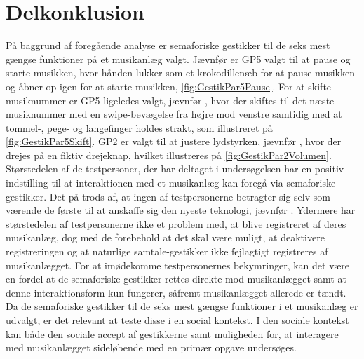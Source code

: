 \section{Delkonklusion}
\label{ValgAfGestikkerDelkonklusion}
%
På baggrund af foregående analyse er semaforiske gestikker til de seks mest gængse funktioner på et musikanlæg valgt. Jævnfør  er GP5 valgt til at pause og starte musikken, hvor hånden lukker som et krokodillenæb for at pause musikken og åbner op igen for at starte musikken, \autoref{fig:GestikPar5Pause}. For at skifte musiknummer er GP5 ligeledes valgt, jævnfør , hvor der skiftes til det næste musiknummer med en swipe-bevægelse fra højre mod venstre samtidig med at tommel-, pege- og langefinger holdes strakt, som illustreret på \autoref{fig:GestikPar5Skift}. GP2 er valgt til at justere lydstyrken, jævnfør , hvor der drejes på en fiktiv drejeknap, hvilket illustreres på \autoref{fig:GestikPar2Volumen}. Størstedelen af de testpersoner, der har deltaget i undersøgelsen har en positiv indstilling til at interaktionen med et musikanlæg kan foregå via semaforiske gestikker. Det på trods af, at ingen af testpersonerne betragter sig selv som værende de første til at anskaffe sig den nyeste teknologi, jævnfør . Ydermere har størstedelen af testpersonerne ikke et problem med, at blive registreret af deres musikanlæg, dog med de forebehold at det skal være muligt, at deaktivere registreringen og at naturlige samtale-gestikker ikke fejlagtigt registreres af musikanlægget. For at imødekomme testpersonernes bekymringer, kan det være en fordel at de semaforiske gestikker rettes direkte mod musikanlægget samt at denne interaktionsform kun fungerer, såfremt musikanlægget allerede er tændt. \blankline
%
Da de semaforiske gestikker til de seks mest gængse funktioner i et musikanlæg er udvalgt, er det relevant at teste disse i en social kontekst. I den sociale kontekst kan både den sociale accept af gestikkerne samt muligheden for, at interagere med musikanlægget sideløbende med en primær opgave undersøges. 